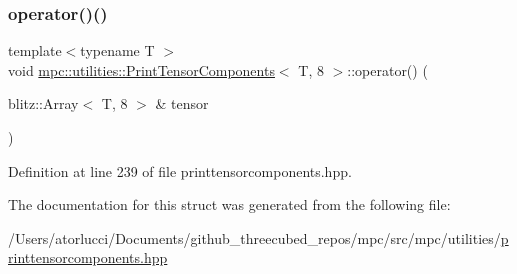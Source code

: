 \subsubsection{\texorpdfstring{operator()()}{operator()()}}
{\footnotesize\ttfamily template$<$typename T $>$ \\
void \mbox{\hyperlink{structmpc_1_1utilities_1_1_print_tensor_components}{mpc\+::utilities\+::\+Print\+Tensor\+Components}}$<$ T, 8 $>$\+::operator() (\begin{DoxyParamCaption}\item[{blitz\+::\+Array$<$ T, 8 $>$ \&}]{tensor }\end{DoxyParamCaption})\hspace{0.3cm}{\ttfamily [inline]}}



Definition at line 239 of file printtensorcomponents.\+hpp.



The documentation for this struct was generated from the following file\+:\begin{DoxyCompactItemize}
\item 
/\+Users/atorlucci/\+Documents/github\+\_\+threecubed\+\_\+repos/mpc/src/mpc/utilities/\mbox{\hyperlink{printtensorcomponents_8hpp}{printtensorcomponents.\+hpp}}\end{DoxyCompactItemize}
